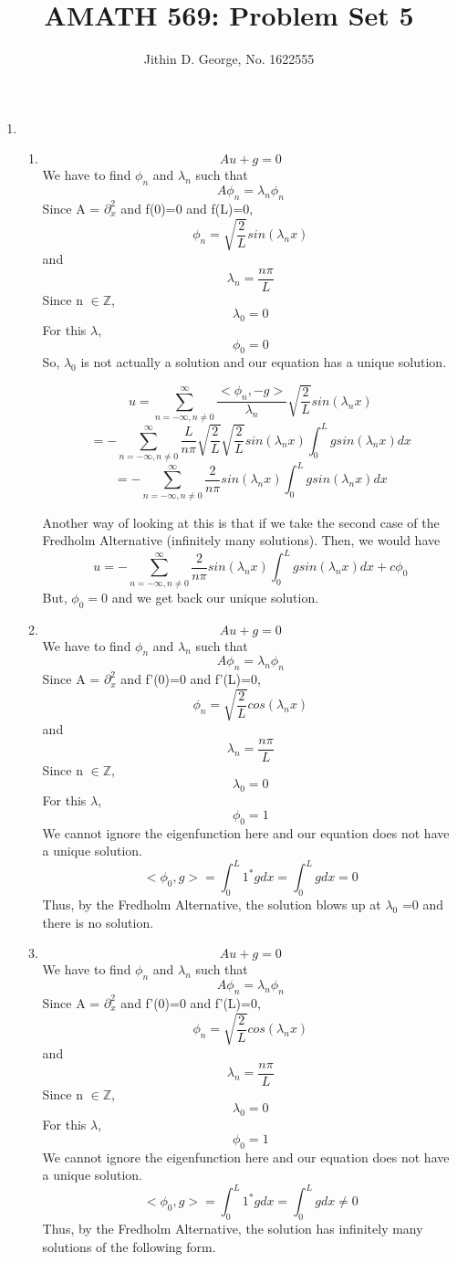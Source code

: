 \documentclass[a4paper,12 pt]{article}
\title{AMATH 569: Problem Set 5}
\author{Jithin D. George, No. 1622555}
\begin{document}
\maketitle
\begin{enumerate}
	\item
 
 \begin{enumerate}
	
	\item \[Au +g =0\]
	We have to find $\phi_n$ and $\lambda_n$ such that
\[A\phi_n = \lambda_n\phi_n \]
Since A = $\partial_x^2$ and f(0)=0 and f(L)=0,
\[\phi_n = \sqrt{\frac{2}{L}}sin(\lambda_n x)\]
 and 
 \[\lambda_n = \frac{n \pi}{L}\]
 Since n $\in \mathbb{Z}$,
  \[\lambda_0 = 0\]
 For this $\lambda$,
 \[\phi_0 = 0\]
 So, $\lambda_0$ is not actually a solution and our equation has a unique solution.

\[u = \sum_{n=-\infty, n \neq 0 }^{\infty} \frac{<\phi_n,-g>}{\lambda_n}\sqrt{\frac{2}{L}}sin(\lambda_n x)\]
\[ =-\sum_{n=-\infty, n \neq 0 }^{\infty} \frac{L}{n\pi}\sqrt{\frac{2}{L}}\sqrt{\frac{2}{L}}sin(\lambda_n x)\int_{0}^{L} gsin(\lambda_n x) dx\]
\[ =-\sum_{n=-\infty, n \neq 0 }^{\infty} \frac{2}{n\pi}sin(\lambda_n x)\int_{0}^{L} gsin(\lambda_n x) dx\]

 Another way of looking at this is that if we take the second case of the Fredholm Alternative (infinitely many solutions). Then, we would have
 \[u =-\sum_{n=-\infty, n \neq 0 }^{\infty} \frac{2}{n\pi}sin(\lambda_n x)\int_{0}^{L} gsin(\lambda_n x) dx +c \phi_0\] 
 But, $\phi_0 =0$ and we get back our unique solution.
	\item
\[Au +g =0\]
We have to find $\phi_n$ and $\lambda_n$ such that
\[A\phi_n = \lambda_n\phi_n \]
Since A = $\partial_x^2$ and f'(0)=0 and f'(L)=0,
\[\phi_n = \sqrt{\frac{2}{L}}cos(\lambda_n x)\]
and 
\[\lambda_n = \frac{n \pi}{L}\]
Since n $\in \mathbb{Z}$,
\[\lambda_0 = 0\]
For this $\lambda$,
\[\phi_0 = 1\]
We cannot ignore the eigenfunction here and our equation does not have a unique solution.
\[<\phi_0,g>= \int_{0}^{L} 1^* g dx = \int_{0}^{L} g dx = 0 \]
Thus, by the Fredholm Alternative, the solution blows up at $\lambda_0$ =0 and there is no solution.


	\item
\[Au +g =0\]
We have to find $\phi_n$ and $\lambda_n$ such that
\[A\phi_n = \lambda_n\phi_n \]
Since A = $\partial_x^2$ and f'(0)=0 and f'(L)=0,
\[\phi_n = \sqrt{\frac{2}{L}}cos(\lambda_n x)\]
and 
\[\lambda_n = \frac{n \pi}{L}\]
Since n $\in \mathbb{Z}$,
\[\lambda_0 = 0\]
For this $\lambda$,
\[\phi_0 = 1\]
We cannot ignore the eigenfunction here and our equation does not have a unique solution.
\[<\phi_0,g>= \int_{0}^{L} 1^* g dx = \int_{0}^{L} g dx \neq 0 \]
Thus, by the Fredholm Alternative, the solution has infinitely many solutions of the following form.


\end{enumerate}
\end{enumerate}
\end{document}
